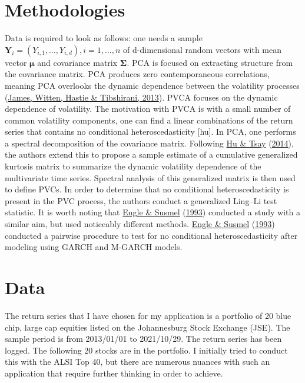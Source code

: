 \documentclass[11pt,preprint, authoryear]{elsarticle}
\numberwithin{equation}{section}
\numberwithin{figure}{section}
\numberwithin{table}{section}
\begin{document}
\hypertarget{methodologies}{%
\section{\texorpdfstring{Methodologies
\label{Meth}}{Methodologies }}\label{methodologies}}

Data is required to look as follows: one needs a sample
\(\mathbf{Y}_i = (Y_{i,1},..., Y_{i,d}), i=1,...,n\) of d-dimensional
random vectors with mean vector \(\mathbf{\mu}\) and covariance matrix
\(\mathbf{\Sigma}\). PCA is focused on extracting structure from the
covariance matrix. PCA produces zero contemporaneous correlations,
meaning PCA overlooks the dynamic dependence between the volatility
processes (\protect\hyperlink{ref-ISLR}{James, Witten, Hastie \&
Tibshirani, 2013}). PVCA focuses on the dynamic dependence of
volatility. The motivation with PVCA is with a small number of common
volatility components, one can find a linear combinations of the return
series that contains no conditional heteroscedasticity {[}hu{]}. In PCA,
one performs a spectral decomposition of the covariance matrix.
Following \protect\hyperlink{ref-hu}{Hu \& Tsay}
(\protect\hyperlink{ref-hu}{2014}), the authors extend this to propose a
sample estimate of a cumulative generalized kurtosis matrix to summarize
the dynamic volatility dependence of the multivariate time series.
Spectral analysis of this generalized matrix is then used to define
PVCs. In order to determine that no conditional heteroscedasticity is
present in the PVC process, the authors conduct a generalized Ling--Li
test statistic. It is worth noting that
\protect\hyperlink{ref-engle}{Engle \& Susmel}
(\protect\hyperlink{ref-engle}{1993}) conducted a study with a similar
aim, but used noticeably different methods.
\protect\hyperlink{ref-engle}{Engle \& Susmel}
(\protect\hyperlink{ref-engle}{1993}) conducted a pairwise procedure to
test for no conditional heteroscedasticity after modeling using GARCH
and M-GARCH models.

\hypertarget{data}{%
\section{\texorpdfstring{Data \label{Data}}{Data }}\label{data}}

The return series that I have chosen for my application is a portfolio
of 20 blue chip, large cap equities listed on the Johannesburg Stock
Exchange (JSE). The sample period is from 2013/01/01 to 2021/10/29. The
return series has been logged. The following 20 stocks are in the
portfolio. I initially tried to conduct this with the ALSI Top 40, but
there are numerous nuances with such an application that require further
thinking in order to achieve.
\end{document}
